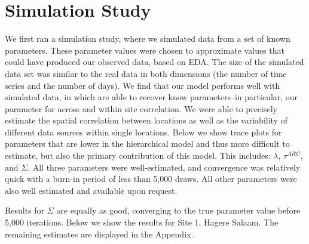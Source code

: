 \documentclass[12pt]{article}
\begin{document}

\section{Simulation Study}
\label{sec:sim}
We first ran a simulation study, where we simulated data from a set of known parameters. These parameter values were chosen to approximate values that could have produced our observed data, based on EDA. The size of the simulated data set was similar to the real data in both dimensions (the number of time series and the number of days). We find that our model performs well with simulated data, in which are able to recover know parameters--in particular, our parameter for across and within site correlation. We were able to precisely estimate the spatial correlation between locations as well as the variability of different data sources within single locations. Below we show trace plots for parameters that are lower in the hierarchical model and thus more difficult to estimate, but also the primary contribution of this model. This includes: $\lambda$, $\tau^{ARC}$, and $\Sigma$. All three parameters were well-estimated, and convergence was relatively quick with a burn-in period of less than 5,000 draws. All other parameters were also well estimated and available upon request. 







Results for $\Sigma$ are equally as good, converging to the true parameter value before 5,000 iterations. Below we show the results for Site 1, Hagere Salaam. The remaining estimates are displayed in the Appendix. 
\end{document}
